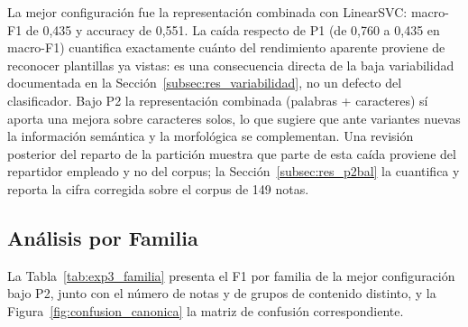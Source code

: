 La mejor configuración fue la representación combinada con LinearSVC: macro-F1 de 0,435 y accuracy de 0,551. La caída respecto de P1 (de 0,760 a 0,435 en macro-F1) cuantifica exactamente cuánto del rendimiento aparente proviene de reconocer plantillas ya vistas: es una consecuencia directa de la baja variabilidad documentada en la Sección~\ref{subsec:res_variabilidad}, no un defecto del clasificador. Bajo P2 la representación combinada (palabras + caracteres) sí aporta una mejora sobre caracteres solos, lo que sugiere que ante variantes nuevas la información semántica y la morfológica se complementan. Una revisión posterior del reparto de la partición muestra que parte de esta caída proviene del repartidor empleado y no del corpus; la Sección~\ref{subsec:res_p2bal} la cuantifica y reporta la cifra corregida sobre el corpus de 149 notas.

\subsection{Análisis por Familia}

La Tabla~\ref{tab:exp3_familia} presenta el F1 por familia de la mejor configuración bajo P2, junto con el número de notas y de grupos de contenido distinto, y la Figura~\ref{fig:confusion_canonica} la matriz de confusión correspondiente.

